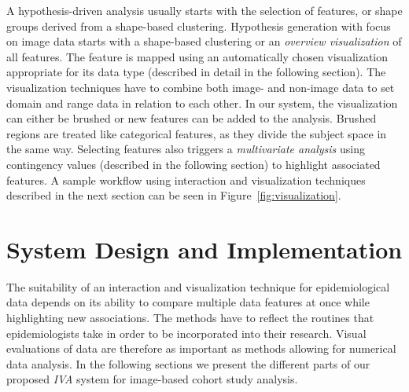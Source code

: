 \documentclass[journal]{style/vgtc} 			          %
\newcommand{\rem}[1]{\textcolor{red}{\sout{#1}}}
\begin{document}
%
A hypothesis-driven analysis usually starts with the selection of features, or shape groups derived from a shape-based clustering.
%
Hypothesis generation with focus on image data starts with a shape-based clustering or an \emph{overview visualization} of all features.
%
The feature is mapped using an automatically chosen visualization appropriate for its data type (described in detail in the following section).
%
The visualization techniques have to combine both image- and non-image data to set domain and range data in relation to each other.
%
In our system, the visualization can either be brushed or new features can be added to the analysis. 
%
%
Brushed regions are treated like categorical features, as they divide the subject space in the same way.
%
Selecting features also triggers a \emph{multivariate analysis} using contingency values (described in the following section) to highlight associated features.  %
%
A sample workflow using interaction and visualization techniques described in the next section can be seen in Figure~\ref{fig:visualization}.

\section{System Design and Implementation} \label{Interaction- and Visualization Techniques}
%
The suitability of an interaction and visualization technique for epidemiological data depends on its ability to compare multiple data features at once while highlighting new associations.
%
The methods have to reflect the routines that epidemiologists take in order to be incorporated into their research.
%
Visual evaluations of data are therefore as important as methods allowing for numerical data analysis.
%
In the following sections we present the different parts of our proposed \emph{IVA} system for image-based cohort study analysis.
\end{document}

